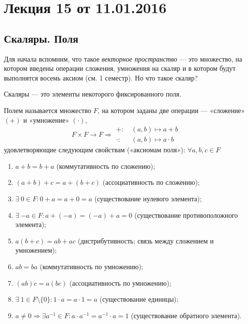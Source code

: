 


\section{Лекция 15 от 11.01.2016}
\subsection{Скаляры. Поля}
Для начала вспомним, что такое \textit{векторное пространство} — это множество, на котором введены операции сложения, умножения на скаляр и в котором будут выполнятся восемь аксиом (см. 1 семестр). Но что такое скаляр?

\begin{Def}
Скаляры — это элементы некоторого фиксированного поля. 
\end{Def}

\begin{Def}
Полем называется множество $F$, на котором заданы две операции —  «сложение» $(+)$ и «умножение» $(\cdot)$,
\[
F \times F \rightarrow F \Rightarrow
\begin{aligned}
+\!:\:& (a, b) \mapsto a + b \\
\cdot:\:& (a, b) \mapsto a \cdot b
\end{aligned}
\]
удовлетворяющие следующим свойствам («аксиомам поля»): $\forall a, b, c \in F$
\begin{enumerate}
\item $a + b = b + a$ (коммутативность по сложению);
\item $(a + b) + c = a + (b + c)$ (ассоциативность по сложению);
\item $\exists\: 0 \in F \colon 0 + a = a + 0 = a$ (существование нулевого элемента);
\item $\exists\: {-a} \in F\colon a + (-a) = (-a) + a = 0$ (существование противоположного элемента);
\item $a(b + c) = ab + ac$ (дистрибутивность; связь между сложением и умножением);
\item $ab = ba$ (коммутативность по умножению);
\item $(ab)c = a(bc)$ (ассоциативность по умножению);
\item $\exists\: 1 \in F\setminus\{0\} : 1 \cdot a = a \cdot 1 = a$ (существование единицы);
\item $a \neq 0 \Rightarrow \exists a^{-1} \in F : a \cdot a^{-1} = a ^{-1} \cdot a = 1$ (существование обратного элемента).
\end{enumerate}
\end{Def}

